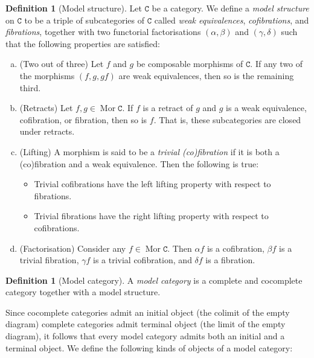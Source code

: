 \documentclass[11pt, reqno]{amsart}
\theoremstyle{definition}
\newtheorem{definition}[theorem]{Definition}
\newcommand{\cat}{\texttt}
\DeclareMathOperator{\Mor}{Mor}   %
\begin{document}
\begin{definition}[Model structure]
\label{def:model-structure}
Let \(\cat C\) be a category. We define a \emph{model structure} on \(\cat C\)
to be a triple of subcategories of \(\cat C\) called \emph{weak equivalences},
\emph{cofibrations}, and \emph{fibrations}, together with two functorial
factorisations \((\alpha, \beta)\) and \((\gamma, \delta)\) such that the following properties are
satisfied:
\begin{enumerate}[(a)]\setlength\itemsep{0em}
\item (Two out of three) Let \(f\) and \(g\) be composable morphisms of
  \(\cat C\). If any two of the morphisms \((f, g, g f)\) are weak
  equivalences, then so is the remaining third.

\item (Retracts) Let \(f, g \in \Mor \cat C\). If \(f\) is a retract of \(g\) and
  \(g\) is a weak equivalence, cofibration, or fibration, then so is \(f\). That
  is, these subcategories are closed under retracts.

\item (Lifting) A morphism is said to be a \emph{trivial (co)fibration} if it is
  both a (co)fibration and a weak equivalence. Then the following is true:
  \begin{itemize}\setlength\itemsep{0em}
  \item Trivial cofibrations have the left lifting property with respect to
    fibrations.
  \item Trivial fibrations have the right lifting property with respect to
    cofibrations.
  \end{itemize}

\item (Factorisation) Consider any \(f \in \Mor \cat C\). Then \(\alpha f\) is a
  cofibration, \(\beta f\) is a trivial fibration, \(\gamma f\) is a trivial cofibration,
  and \(\delta f\) is a fibration.
\end{enumerate}
\end{definition}

\begin{definition}[Model category]
\label{def:model-category}
A \emph{model category} is a complete and cocomplete category together with a
model structure.
\end{definition}

Since cocomplete categories admit an initial object (the colimit of the empty
diagram) complete categories admit terminal object (the limit of the empty
diagram), it follows that every model category admits both an initial and a
terminal object. We define the following kinds of objects of a model category:
\end{document}
